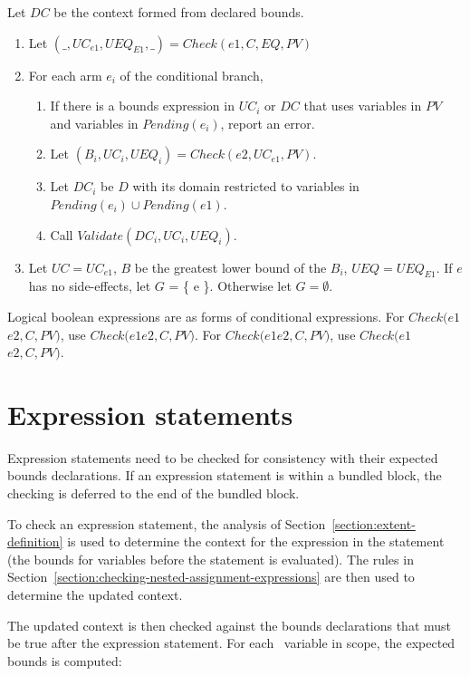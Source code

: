 Let $DC$ be the context formed from declared bounds.
\begin{enumerate}
\item Let $(\_, {UC}_{e1}, {UEQ}_{E1}, \_)= Check(e1, C, EQ, PV)$
\item For each arm $e_i$ of the conditional branch,
\begin{enumerate}
\item If there is a bounds expression in ${UC}_i$ or $DC$ that uses variables in $PV$ and
variables in $Pending(e_i)$, report an error.
\item Let $(B_i, {UC}_i, {UEQ}_i) = Check(e2, {UC}_{e1}, PV)$.
\item Let $DC_i$ be $D$ with its domain restricted to variables in $Pending(e_i) \cup Pending(e1)$. 
\item Call $Validate(DC_i, {UC}_i, {UEQ}_i)$.
\end{enumerate}
\item Let $UC = {UC}_{e1}$, $B$ be the greatest lower bound of the $B_i$, $UEQ = {UEQ}_{E1}$.
If $e$ has no side-effects, let $G$ = \{ e \}.  Otherwise let $G=\emptyset$.
\end{enumerate}

Logical boolean expressions are as forms of conditional expressions.
For  $Check(e1$\code{ && }$e2, C, PV)$, use $Check(e1$$e2$$, C, PV)$.  For
$Check(e1$\code{ || }$e2, C, PV)$,  use $Check(e1$$e2, C, PV)$.

\section{Expression statements}
\label{section:checking-expression-statements}

Expression statements need to be checked for consistency with their
expected bounds declarations. If an expression statement is within a
bundled block, the checking is deferred to the end of the bundled block.

To check an expression statement, the analysis of 
Section~\ref{section:extent-definition} is used
to determine the context for the expression in the statement (the bounds
for variables before the statement is evaluated). The rules in 
Section~\ref{section:checking-nested-assignment-expressions}
are then used to determine the updated context.

The updated context is then checked against the bounds declarations that
must be true after the expression statement. For each
\arrayptr\ variable  in scope, the expected bounds is
computed:

